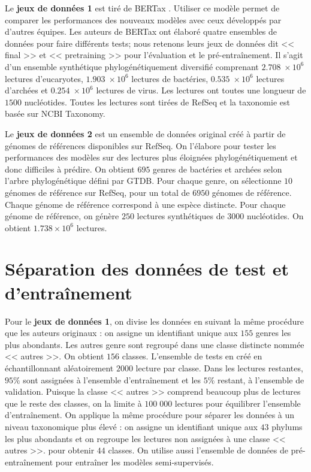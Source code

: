 Le \textbf{jeux de données 1} est tiré de BERTax \cite{mock2022}. Utiliser ce modèle permet de
comparer les performances des nouveaux modèles avec ceux développés par d'autres équipes. Les
auteurs de BERTax ont élaboré quatre ensembles de données pour faire différents tests; nous retenons
leurs jeux de données dit << final >> et << pretraining >> pour l'évaluation et le pré-entraînement.
Il s'agit d'un ensemble synthétique phylogénétiquement diversifié comprenant $2.708\;\times 10^6$
lectures d'eucaryotes, $1.903\;\times 10^6$ lectures de bactéries, $0.535\;\times 10^6$ lectures
d'archées et $0.254\;\times 10^6$ lectures de virus. Les lectures ont toutes une longueur de $1500$
nucléotides. Toutes les lectures sont tirées de RefSeq et la taxonomie est basée sur NCBI Taxonomy.

Le \textbf{jeux de données 2} est un ensemble de données original créé à partir de génomes de
références disponibles sur RefSeq. On l'élabore pour tester les performances des modèles sur des
lectures plus éloignées phylogénétiquement et donc difficiles à prédire. On obtient $695$ genres de
bactéries et archées selon l'arbre phylogénétique défini par GTDB. Pour chaque genre, on sélectionne
$10$ génomes de référence sur RefSeq, pour un total de $6950$ génomes de référence. Chaque génome
de référence correspond à une espèce distincte. Pour chaque génome de référence, on génère $250$
lectures synthétiques de $3000$ nucléotides. On obtient $1.738 \times 10^6$ lectures.

\section{Séparation des données de test et d'entraînement}
Pour le \textbf{jeux de données 1}, on divise les données en suivant la même procédure que les
auteurs originaux : on assigne un identifiant unique aux $155$ genres les plus abondants. Les autres
genre sont regroupé dans une classe distincte nommée << autres >>. On obtient $156$ classes.
L'ensemble de tests en créé en échantillonnant aléatoirement $2000$ lecture par classe. Dans les
lectures restantes, $95\%$ sont assignées à l'ensemble d'entraînement et les $5\%$ restant, à
l'ensemble de validation. Puisque la classe << autres >> comprend beaucoup plus de lectures que le
reste des classes, on la limite à $100\;000$ lectures pour équilibrer l'ensemble d'entraînement. On
applique la même procédure pour séparer les données à un niveau taxonomique plus élevé : on assigne
un identifiant unique aux $43$ phylums les plus abondants et on regroupe les lectures non assignées
à une classe << autres >>. pour obtenir $44$ classes. On utilise aussi l'ensemble de données de
pré-entraînement pour entraîner les modèles semi-supervisés.

